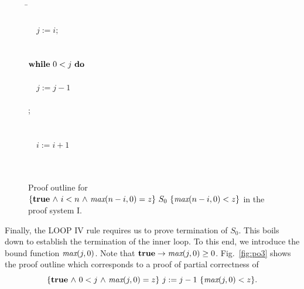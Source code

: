 \documentclass[runningheads]{llncs}       %
\begin{document}
 \begin{figure}[ht]
 \begin{tabbing}
 \qquad\qquad                                       
\=   \\
\>                           \\
\>  \ \ $j:=i; $                                \\
\>                            \\
\>             \\
\> \qquad $\mbox{$\mbox{{\bf while}\ } {0 < j}\ \mbox{{\bf do}\ }$}$                          \\
\>  \qquad {}                  \\
\>  \qquad \ \ $j:=j-1$                         \\
\> \qquad {}                    \\
\>  \OD ;                                       \\
\>            \\
\>                       \\
\>  \ \ $i:=i+1$                                \\
\>                            \\
\>                \\
[\bigskipamount]
\end{tabbing}
\caption{Proof outline for $\mbox{$\{{\mbox{{\bf true}}\mbox{$\ \wedge\ $} i < n \mbox{$\ \wedge\ $} \mbox{\it max}(n-i,0) = z}\}\ {S_0}\ \{{\mbox{\it max}(n-i,0) < z}\}$}$  in the proof system I.}
\label{fig:po2}

\end{figure}

Finally, the LOOP IV rule requires us to prove termination of $S_0$.
This boils down to establish the termination of the inner loop.
To this end, we introduce
the bound function $\mbox{\it max}(j,0)$.
Note that $\mbox{{\bf true}}\to \mbox{\it max}(j,0)\geq 0$. 
Fig.~\ref{fig:po3} shows the proof outline
which corresponds to a proof of  partial correctness of
$$\mbox{$\{{\mbox{{\bf true}}\mbox{$\ \wedge\ $} 0<j\mbox{$\ \wedge\ $}  \mbox{\it max}(j,0)= z}\}\ {j:=j-1}\ \{{\mbox{\it max}(j,0) < z}\}$}.$$
\end{document}
